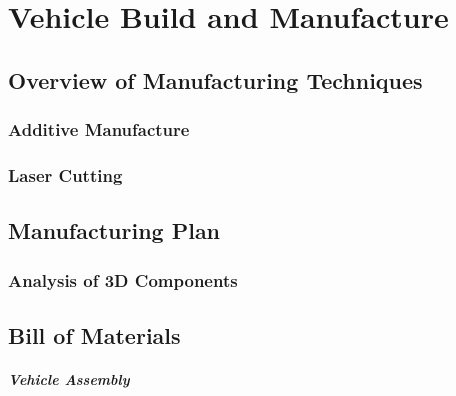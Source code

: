 \section{Vehicle Build and Manufacture}
  \subsection{Overview of Manufacturing Techniques}
    \subsubsection{Additive Manufacture}
    \label{subsubsec:additive-manufacture}
    \subsubsection{Laser Cutting}
    
  \subsection{Manufacturing Plan}
    \subsubsection{Analysis of 3D Components}
  
  \subsection{Bill of Materials}
  
  \subparagraph{Vehicle Assembly}
